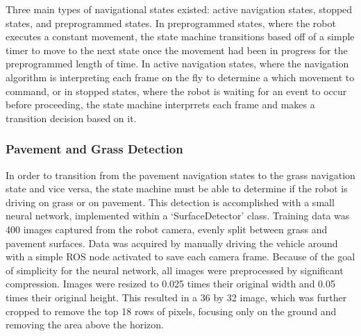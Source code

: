 \documentclass[titlepage, twocolumn]{article}
\begin{document}
        Three main types of navigational states existed: active navigation states, stopped states, and preprogrammed states. In preprogrammed states, where the robot executes a constant movement, the state machine transitions based off of a simple timer to move to the next state once the movement had been in progress for the preprogrammed length of time. In active navigation states, where the navigation algorithm is interpreting each frame on the fly to determine a which movement to command, or in stopped states, where the robot is waiting for an event to occur before proceeding, the state machine interprrets each frame and makes a transition decision based on it.

        \subsubsection{Pavement and Grass Detection}
            In order to transition from the pavement navigation states to the grass navigation state and vice versa, the state machine must be able to determine if the robot is driving on grass or on pavement. This detection is accomplished with a small neural network, implemented within a `SurfaceDetector' class. Training data was 400 images captured from the robot camera, evenly split between grass and pavement surfaces. Data was acquired by manually driving the vehicle around with a simple ROS node activated to save each camera frame. Because of the goal of simplicity for the neural network, all images were preprocessed by significant compression. Images were resized to 0.025 times their original width and 0.05 times their original height. This resulted in a 36 by 32 image, which was further cropped to remove the top 18 rows of pixels, focusing only on the ground and removing the area above the horizon.
\end{document}
